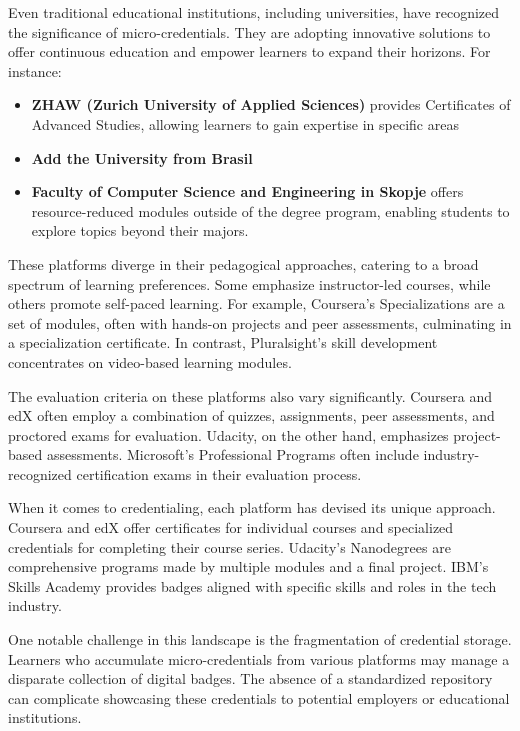 \documentclass{article}
\begin{document}
\begin{multicols}{2}
    Even traditional educational institutions, including universities, have recognized the significance of micro-credentials. They are adopting innovative solutions to offer continuous education and empower learners to expand their horizons. For instance:

    \begin{itemize}
        \item \textbf{ZHAW (Zurich University of Applied Sciences)} provides Certificates of Advanced Studies, allowing learners to gain expertise in specific areas
        \item \textbf{Add the University from Brasil}
        \item \textbf{Faculty of Computer Science and Engineering in Skopje} offers resource-reduced modules outside of the degree program, enabling students to explore topics beyond their majors.
    \end{itemize}

    These platforms diverge in their pedagogical approaches, catering to a broad spectrum of learning preferences. Some emphasize instructor-led courses, while others promote self-paced learning. For example, Coursera's Specializations are a set of modules, often with hands-on projects and peer assessments, culminating in a specialization certificate. In contrast, Pluralsight's skill development concentrates on video-based learning modules.

    The evaluation criteria on these platforms also vary significantly. Coursera and edX often employ a combination of quizzes, assignments, peer assessments, and proctored exams for evaluation. Udacity, on the other hand, emphasizes project-based assessments. Microsoft's Professional Programs often include industry-recognized certification exams in their evaluation process.

    When it comes to credentialing, each platform has devised its unique approach. Coursera and edX offer certificates for individual courses and specialized credentials for completing their course series. Udacity's Nanodegrees are comprehensive programs made by multiple modules and a final project. IBM's Skills Academy provides badges aligned with specific skills and roles in the tech industry.

    One notable challenge in this landscape is the fragmentation of credential storage. Learners who accumulate micro-credentials from various platforms may manage a disparate collection of digital badges. The absence of a standardized repository can complicate showcasing these credentials to potential employers or educational institutions.


\end{multicols}
\end{document}
